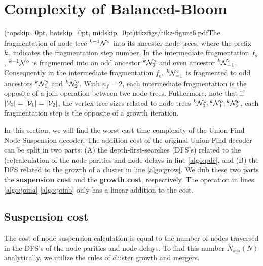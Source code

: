 
\section{Complexity of Balanced-Bloom}\label{sec:complexity}

\Figure[htb](topskip=0pt, botskip=0pt, midskip=0pt){tikzfigs/tikz-figure6.pdf}{The fragmentation of node-tree ${}^{k-1}\mathcal{N}^o$ into its ancester node-trees, where the prefix $k_1$ indicates the fragmentation step number. In the intermediate fragmentation $f_o$, ${}^{k-1}\mathcal{N}^o$ is fragmented into an odd ancestor ${}^{k}\mathcal{N}^o_0$ and even ancestor ${}^{k}\mathcal{N}^e_{-1}$. Consequently in the intermediate fragmentation $f_e$, ${}^{k}\mathcal{N}^e_{-1}$ is fragmented to odd ancestors ${}^{k}\mathcal{N}^o_{1}$ and ${}^{k}\mathcal{N}^o_{2}$. With $n_f=2$, each intermediate fragmentation is the opposite of a join operation between twe node-trees. Futhermore, note that if $\lvert\mathcal{V}_0\rvert = \lvert\mathcal{V}_1\rvert = \lvert\mathcal{V}_2\rvert$, the vertex-tree sizes related to node trees ${}^{k}\mathcal{N}^o_0, {}^{k}\mathcal{N}^o_1, {}^{k}\mathcal{N}^o_2$, each fragmentation step is the opposite of a growth iteration. \label{fig6}}

In this section, we will find the worst-cast time complexity of the Union-Find Node-Suspension decoder. The addition cost of the original Union-Find decoder can be split in two parts: (A) the depth-first-searches (DFS's) related to the (re)calculation of the node parities and node delays in line \ref{algo:pdc}, and (B) the DFS related to the growth of a cluster in line \ref{algo:grow}. We dub these two parts the \textbf{suspension cost} and the \textbf{growth cost}, respectively. The  operation in lines \ref{algo:joina}-\ref{algo:joinb} only has a linear addition to the cost.

\subsection{Suspension cost}\label{sec:suscomplexity}

The cost of node suspension calculation is equal to the number of nodes traversed in the DFS's of the node parities and node delays. To find this number $N_{sus}(N)$ analytically, we utilize the rules of cluster growth and mergers.


